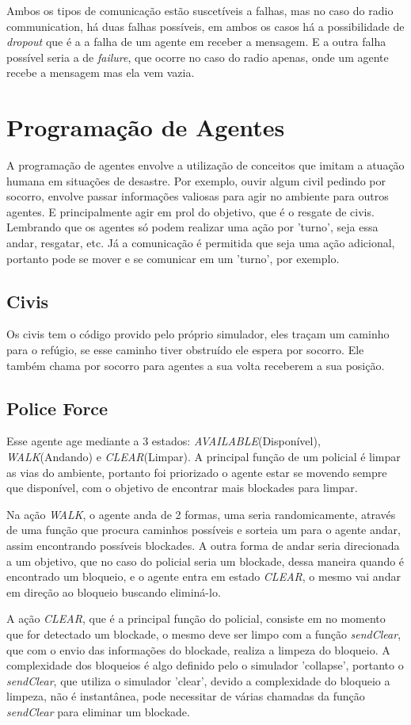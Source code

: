 \documentclass[conference]{IEEEtran}
\begin{document}
Ambos os tipos de comunicação estão suscetíveis a falhas, mas no caso do radio communication, há duas falhas possíveis, em ambos os casos há a possibilidade de \textit{dropout} que é a a falha de um agente em receber a mensagem. E a outra falha possível seria a de \textit{failure}, que ocorre no caso do radio apenas, onde um agente recebe a mensagem mas ela vem vazia.

\section{Programação de Agentes}
A programação de agentes envolve a utilização de conceitos que imitam a atuação humana em situações de desastre. Por exemplo, ouvir algum civil pedindo por socorro, envolve passar informações valiosas para agir no ambiente para outros agentes. E principalmente agir em prol do objetivo, que é o resgate de civis.
Lembrando que os agentes só podem realizar uma ação por 'turno', seja essa andar, resgatar, etc. Já a comunicação é permitida que seja uma ação adicional, portanto pode se mover e se comunicar em um 'turno', por exemplo.
\subsection{Civis}
Os civis tem o código provido pelo próprio simulador, eles traçam um caminho para o refúgio, se esse caminho tiver obstruído ele espera por socorro. Ele também chama por socorro para agentes a sua volta receberem a sua posição.
\subsection{Police Force}
Esse agente age mediante a 3 estados: \textit{AVAILABLE}(Disponível), \textit{WALK}(Andando) e \textit{CLEAR}(Limpar). A principal função de um policial é limpar as vias do ambiente, portanto foi priorizado o agente estar se movendo sempre que disponível, com o objetivo de encontrar mais blockades para limpar.

Na ação \textit{WALK}, o agente anda de 2 formas, uma seria randomicamente, através de uma função que procura caminhos possíveis e sorteia um para o agente andar, assim encontrando possíveis blockades. A outra forma de andar seria direcionada a um objetivo, que no caso do policial seria um blockade, dessa maneira quando é encontrado um bloqueio, e o agente entra em estado \textit{CLEAR}, o mesmo vai andar em direção ao bloqueio buscando eliminá-lo.

A ação \textit{CLEAR}, que é a principal função do policial, consiste em no momento que for detectado um blockade, o mesmo deve ser limpo com a função \textit{sendClear}, que com o envio das informações do blockade, realiza a limpeza do bloqueio. A complexidade dos bloqueios é algo definido pelo o simulador 'collapse', portanto o \textit{sendClear}, que utiliza o simulador 'clear', devido a complexidade do bloqueio a limpeza, não é instantânea, pode necessitar de várias chamadas da função \textit{sendClear} para eliminar um blockade.
\end{document}
